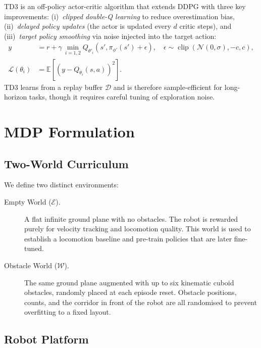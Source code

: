 \documentclass{article}
\begin{document}
TD3 \cite{fujimoto2018addressing} is an off-policy actor-critic algorithm
that extends DDPG \cite{lillicrap2015continuous} with three key
improvements: (i)~\emph{clipped double-Q learning} to reduce overestimation
bias, (ii)~\emph{delayed policy updates} (the actor is updated every $d$
critic steps), and (iii)~\emph{target policy smoothing} via noise injected
into the target action:
\begin{align}
  y &= r + \gamma\,\min_{i=1,2} Q_{\theta'_i}\!\left(s', \pi_{\phi'}(s') + \epsilon\right),
      \quad \epsilon \sim \operatorname{clip}(\mathcal{N}(0,\sigma),{-c},{c}), \\
  \mathcal{L}(\theta_i) &= \mathbb{E}\!\left[(y - Q_{\theta_i}(s,a))^2\right].
\end{align}
TD3 learns from a replay buffer $\mathcal{D}$ and is therefore sample-efficient
for long-horizon tasks, though it requires careful tuning of exploration noise.

\section{MDP Formulation}

\subsection{Two-World Curriculum}

We define two distinct environments:

\begin{description}
  \item[Empty World ($\mathcal{E}$).] A flat infinite ground plane with no
        obstacles. The robot is rewarded purely for velocity tracking and
        locomotion quality. This world is used to establish a locomotion
        baseline and pre-train policies that are later fine-tuned.
  \item[Obstacle World ($\mathcal{W}$).] The same ground plane augmented with
        up to six kinematic cuboid obstacles, randomly placed at each episode
        reset. Obstacle positions, counts, and the corridor in front of the
        robot are all randomised to prevent overfitting to a fixed layout.
\end{description}

\subsection{Robot Platform}
\end{document}

